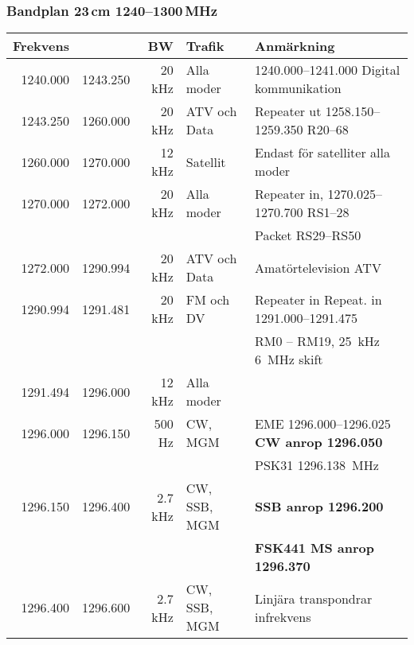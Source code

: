 \subsubsection{Bandplan 23\,cm 1240--1300\,MHz}
\begin{tabular}{rrrll}
	\textbf{Frekvens} &          & \textbf{BW} & \textbf{Trafik} & \textbf{Anmärkning}          \\ \hline
        
1240.000 & 1243.250 & 20 kHz  & Alla moder   & \numrange{1240,000}{1241,000} Digital kommunikation           \\ \hline
1243.250 & 1260.000 & 20 kHz  & ATV och Data & Repeater ut \numrange{1258,150}{1259,350}  R20--68            \\ \hline
1260.000 & 1270.000 & 12 kHz  & Satellit     & Endast för satelliter alla moder                              \\ \hline
1270.000 & 1272.000 & 20 kHz  & Alla moder   & Repeater in, \numrange{1270,025}{1270,700} RS1--28            \\
	 &          &         &              & Packet RS29--RS50                                             \\ \hline
1272.000 & 1290.994 & 20 kHz  & ATV och Data & Amatörtelevision ATV                                          \\ \hline
1290.994 & 1291.481 & 20 kHz  & FM och DV    & Repeater in Repeat. in \numrange{1291,000}{1291,475}          \\
	 &          &         &              & RM0 – RM19, \SI{25}{\kilo\hertz} \SI{6}{\mega\hertz} skift    \\ \hline
1291.494 & 1296.000 & 12 kHz  & Alla moder   &                                                               \\ \hline
1296.000 & 1296.150 & 500 Hz  & CW,  MGM     & EME \numrange{1296,000}{1296,025} \textbf{CW anrop 1296.050}  \\
	 &          &         &              & PSK31 \SI{1296,138}{\mega\hertz}                              \\ \hline
1296.150 & 1296.400 & 2.7 kHz & CW, SSB, MGM & \textbf{SSB anrop \num{1296,200}}                             \\
	 &          &         &              & \textbf{FSK441 MS anrop \num{1296,370}}                       \\ \hline
1296.400 & 1296.600 & 2.7 kHz & CW, SSB, MGM & Linjära transpondrar infrekvens                               \\ \hline

\end{tabular}
